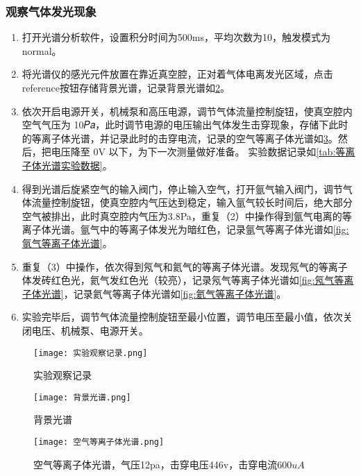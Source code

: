 \documentclass[dvipsnames, svgnames,a4paper,11pt]{article}
\begin{document}
\subsubsection{观察气体发光现象}
\begin{enumerate}
	\item 打开光谱分析软件，设置积分时间为500ms，平均次数为10，触发模式为normal。
	\item 将光谱仪的感光元件放置在靠近真空腔，正对着气体电离发光区域，点击reference按钮存储背景光谱，记录背景光谱如\cref{fig:背景光谱}。
	\item 依次开启电源开关，机械泵和高压电源，调节气体流量控制旋钮，使真空腔内空气气压为 10𝑃𝑎，此时调节电源的电压输出气体发生击穿现象，存储下此时的等离子体光谱，并记录此时的击穿电流，记录的空气等离子体光谱如\cref{fig:空气等离子体光谱}。然后，把电压降至 0V 以下，为下一次测量做好准备。 实验数据记录如\cref{tab:等离子体光谱实验数据}。
	\item 得到光谱后旋紧空气的输入阀门，停止输入空气，打开氩气输入阀门，调节气体流量控制旋钮，使真空腔内气压达到稳定，输入氩气较长时间后，绝大部分空气被排出，此时真空腔内气压为3.8Pa，重复（2）中操作得到氩气电离的等离子体光谱。氩气中的等离子体发光为暗红色，记录氩气等离子体光谱如\cref{fig:氩气等离子体光谱}。
	\item 重复（3）中操作，依次得到氖气和氦气的等离子体光谱。发现氖气的等离子体发砖红色光，氦气发红色光（较亮），记录氖气等离子体光谱如\cref{fig:氖气等离子体光谱}，记录氦气等离子体光谱如\cref{fig:氦气等离子体光谱}。
	\item 实验完毕后，调节气体流量控制旋钮至最小位置，调节电压至最小值，依次关闭电压、机械泵、电源开关。
\end{enumerate}

	\begin{figure}[htbp]
		\centering
		\texttt{[image: 实验观察记录.png]}
		\caption{实验观察记录}
		\label{fig:实验观察记录}
	\end{figure}

	\begin{figure}[htbp]
		\centering
		\texttt{[image: 背景光谱.png]}
		\caption{背景光谱}
		\label{fig:背景光谱}
	\end{figure}

	\begin{figure}[htbp]
		\centering
		\texttt{[image: 空气等离子体光谱.png]}
		\caption{空气等离子体光谱，气压12pa，击穿电压446v，击穿电流600$uA$}
		\label{fig:空气等离子体光谱}
	\end{figure}
\end{document}
